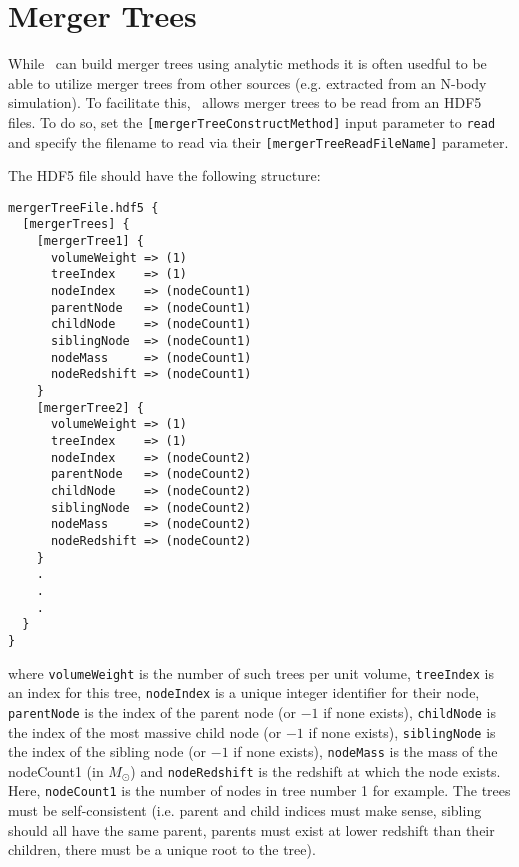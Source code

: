 \section{Merger Trees}\label{sec:MergerTreeFiles}

While \glc\ can build merger trees using analytic methods it is often usedful to be able to utilize merger trees from other sources (e.g. extracted from an N-body simulation). To facilitate this, \glc\ allows merger trees to be read from an HDF5 files. To do so, set the {\tt [mergerTreeConstructMethod]} input parameter to {\tt read} and specify the filename to read via their {\tt [mergerTreeReadFileName]} parameter.

The HDF5 file should have the following structure:
\begin{verbatim}
mergerTreeFile.hdf5 {
  [mergerTrees] {
    [mergerTree1] {
      volumeWeight => (1)
      treeIndex    => (1)
      nodeIndex    => (nodeCount1)
      parentNode   => (nodeCount1)
      childNode    => (nodeCount1)
      siblingNode  => (nodeCount1)
      nodeMass     => (nodeCount1)
      nodeRedshift => (nodeCount1)
    }
    [mergerTree2] {
      volumeWeight => (1)
      treeIndex    => (1)
      nodeIndex    => (nodeCount2)
      parentNode   => (nodeCount2)
      childNode    => (nodeCount2)
      siblingNode  => (nodeCount2)
      nodeMass     => (nodeCount2)
      nodeRedshift => (nodeCount2)
    }
    .
    .
    .
  }
}
\end{verbatim}
where {\tt volumeWeight} is the number of such trees per unit volume, {\tt treeIndex} is an index for this tree, {\tt nodeIndex} is a unique integer identifier for their node, {\tt parentNode} is the index of the parent node (or $-1$ if none exists), {\tt childNode} is the index of the most massive child node (or $-1$ if none exists), {\tt siblingNode} is the index of the sibling node (or $-1$ if none exists), {\tt nodeMass} is the mass of the nodeCount1 (in $M_\odot$) and {\tt nodeRedshift} is the redshift at which the node exists. Here, {\tt nodeCount1} is the number of nodes in tree number 1 for example. The trees must be self-consistent (i.e. parent and child indices must make sense, sibling should all have the same parent, parents must exist at lower redshift than their children, there must be a unique root to the tree).

